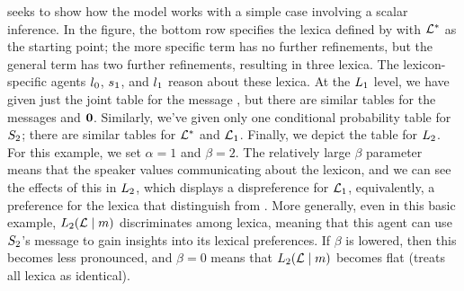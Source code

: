\documentclass[12pt,twoside]{article}
\renewcommand{\_}{\textbf{\textunderscore\hspace{-4pt}\textunderscore\hspace{-3pt}\textunderscore\hspace{-4pt}\textunderscore}\hspace{0.5pt}}			%
\begin{document}
 seeks to show how the model works with a
simple case involving a scalar inference. In the figure, the bottom
row specifies the lexica defined by  with
$\LexStar$ as the starting point; the more specific term has no
further refinements, but the general term has two further refinements,
resulting in three lexica. The lexicon-specific agents
$\listenerZero$, $\speakerOne$, and $\listenerOne$ reason about these
lexica. At the $\ListenerK[1]$ level, we have given just the joint
table for the message , but there are similar tables for
the messages  and $\nullmsg$. Similarly, we've given only
one conditional probability table for $\SpeakerK[2]$; there are
similar tables for $\LexStar$ and $\Lex_{1}$. Finally, we depict the
 table for $\ListenerK[2]$. For this example, we set
$\alpha = 1$ and $\beta = 2$. The relatively large $\beta$ parameter
means that the speaker values communicating about the lexicon, and we
can see the effects of this in $\ListenerK[2]$, which displays a
dispreference for $\Lex_{1}$, equivalently, a preference for the
lexica that distinguish  from . More generally,
even in this basic example, $\ListenerK[2](\Lex\given\msg)$
discriminates among lexica, meaning that this agent can use
$\SpeakerK[2]$'s message to gain insights into its lexical
preferences. If $\beta$ is lowered, then this becomes less pronounced,
and $\beta = 0$ means that $\ListenerK[2](\Lex\given\msg)$ becomes
flat (treats all lexica as identical).
\end{document}
